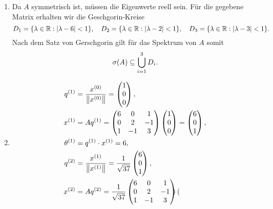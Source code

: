 \documentclass{exercise}
\begin{document}
	\begin{enumerate}
		\item Da \(A\) symmetrisch ist, müssen die Eigenwerte reell sein. Für die gegebene Matrix erhalten wir die Geschgorin-Kreise
		\[
			D_1 = \braces*{\lambda \in \R : \absolute*{\lambda - 6} < 1}, \quad D_2 = \braces*{\lambda \in \R : \absolute*{\lambda - 2} < 1}, \quad D_3 = \braces*{\lambda \in \R : \absolute*{\lambda - 3} < 1}.
		\]
		Nach dem Satz von Gerschgorin gilt für das Spektrum von \(A\) somit
		\[
			\sigma\parentheses*{A} \subseteq \bigcup_{i = 1}^3 D_i.
		\]
		\item
		\begin{align*}
			q^{\parentheses*{1}} &= \frac{x^{\parentheses*{0}}}{\norm*{x^{\parentheses*{0}}}} = \begin{pmatrix}
				1\\
				0\\
				0
			\end{pmatrix},\\
			x^{\parentheses*{1}} &= Aq^{\parentheses*{1}} = \begin{pmatrix}
				6 & 0 & 1\\
				0 & 2 & -1\\
				1 & -1 & 3
			\end{pmatrix}\begin{pmatrix}
				1\\
				0\\
				0
			\end{pmatrix} = \begin{pmatrix}
				6\\
				0\\
				1
			\end{pmatrix},\\
			\theta^{\parentheses*{1}} &= q^{\parentheses*{1}} \cdot x^{\parentheses*{1}} = 6,\\
			q^{\parentheses*{2}} &= \frac{x^{\parentheses*{1}}}{\norm*{x^{\parentheses*{1}}}} = \frac{1}{\sqrt{37}}\begin{pmatrix}
				6\\
				0\\
				1
			\end{pmatrix},\\
			x^{\parentheses*{2}} &= Aq^{\parentheses*{2}} = \frac{1}{\sqrt{37}}\begin{pmatrix}
				6 & 0 & 1\\
				0 & 2 & -1\\
				1 & -1 & 3
			\end{pmatrix}\begin{pmatrix}

\end{pmatrix}
\end{align*}
\end{enumerate}
\end{document}
